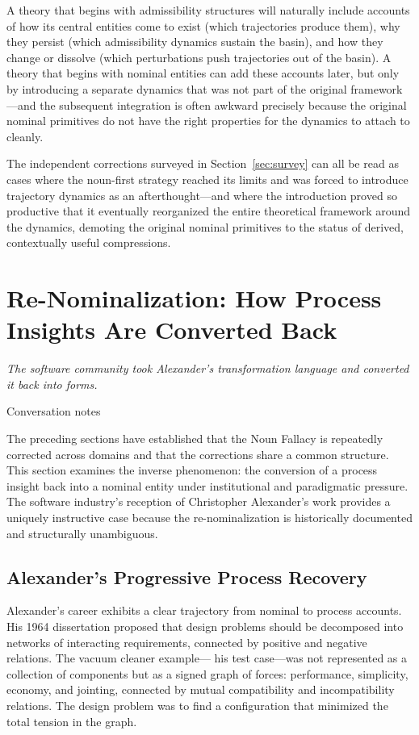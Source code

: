 \documentclass[12pt, a4paper]{article}
\theoremstyle{plain}
\theoremstyle{definition}
\theoremstyle{remark}
\begin{document}
A theory that begins with admissibility structures will naturally include
accounts of how its central entities come to exist (which trajectories
produce them), why they persist (which admissibility dynamics sustain the
basin), and how they change or dissolve (which perturbations push trajectories
out of the basin). A theory that begins with nominal entities can add these
accounts later, but only by introducing a separate dynamics that was not part
of the original framework---and the subsequent integration is often awkward
precisely because the original nominal primitives do not have the right
properties for the dynamics to attach to cleanly.

The independent corrections surveyed in Section~\ref{sec:survey} can all
be read as cases where the noun-first strategy reached its limits and was
forced to introduce trajectory dynamics as an afterthought---and where the
introduction proved so productive that it eventually reorganized the entire
theoretical framework around the dynamics, demoting the original nominal
primitives to the status of derived, contextually useful compressions.

\section{Re-Nominalization: How Process Insights Are Converted Back}
\label{sec:renominalization}

\epigraph{\textit{The software community took Alexander's transformation
language and converted it back into forms.}}{Conversation notes}

\noindent
The preceding sections have established that the Noun Fallacy is repeatedly
corrected across domains and that the corrections share a common structure.
This section examines the inverse phenomenon: the conversion of a process
insight back into a nominal entity under institutional and paradigmatic
pressure. The software industry's reception of Christopher Alexander's work
provides a uniquely instructive case because the re-nominalization is
historically documented and structurally unambiguous.

\subsection{Alexander's Progressive Process Recovery}

Alexander's career exhibits a clear trajectory from nominal to process
accounts. His 1964 dissertation \citep{alexander1964} proposed that design
problems should be decomposed into networks of interacting requirements,
connected by positive and negative relations. The vacuum cleaner example---
his test case---was not represented as a collection of components but as a
signed graph of forces: performance, simplicity, economy, and jointing,
connected by mutual compatibility and incompatibility relations. The design
problem was to find a configuration that minimized the total tension in the
graph.
\end{document}
